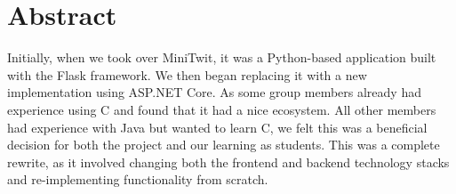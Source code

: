 \documentclass[12pt,a4paper,reqno]{report}
\begin{document}
     
    \clearpage
    \tableofcontents

    \setcounter{page}{0}
    \clearpage 

    \section{Abstract}
    Initially, when we took over MiniTwit, it was a Python-based application built with the Flask framework. We then began replacing it with a new implementation using ASP.NET Core. As some group members already had experience using C and found that it had a nice ecosystem. All other members had experience with Java but wanted to learn C, we felt this was a beneficial decision for both the project and our learning as students. This was a complete rewrite, as it involved changing both the frontend and backend technology stacks and re-implementing functionality from scratch.
    \printbibliography[heading=none]
\end{document}
